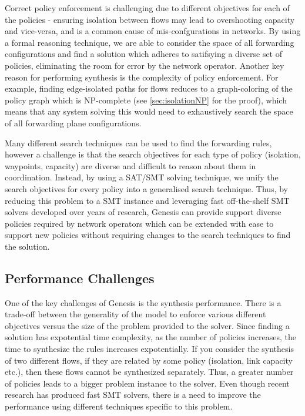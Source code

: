 \documentclass[]{sig}
\begin{document}
Correct policy enforcement is challenging due to different objectives for each of the policies - ensuring isolation between flows may lead to overshooting capacity and vice-versa, and is a common cause of mis-confgurations in networks. By using a formal reasoning technique, we are able to consider the space of all forwarding configurations and find a solution which adheres to satifsying a diverse set of policies, eliminating the room for error by the network operator. Another key reason for performing synthesis is the complexity of policy enforcement. For example, finding edge-isolated paths for flows  reduces to a graph-coloring of the policy graph which is NP-complete (see \cref{sec:isolationNP} for the proof), which means that any system solving this would need to exhaustively search the space of all forwarding plane configurations. 

Many different search techniques can be used to find the forwarding rules, however a challenge is that the search objectives for each type of policy (isolation, waypoints, capacity) are diverse and difficult to reason about them in coordination. Instead, by using a SAT/SMT solving technique, we unify the search objectives for every policy into a generalised search technique. Thus, by reducing this problem to a SMT instance and leveraging fast off-the-shelf SMT solvers developed over years of research, Genesis can provide support diverse policies required by network operators which can be extended with ease to support new policies without requiring changes to the search techniques to find the solution. 
\subsection{Performance Challenges} \label{sec:performance}
One of the key challenges of Genesis is the synthesis performance. There is a trade-off between the generality of the model to enforce various different objectives versus the size of the problem provided to the solver.  Since finding a solution has expotential time complexity, as the number of policies increases, the time to synthesize the rules increases expotentially. If you consider the synthesis of two different flows, if they are related by some policy (isolation, link capacity etc.), then these flows cannot be synthesized separately. Thus, a greater number of policies leads to a bigger problem instance to the solver. Even though recent research has produced fast SMT solvers, there is a need to improve the performance using different techniques specific to this problem. 
\end{document}
